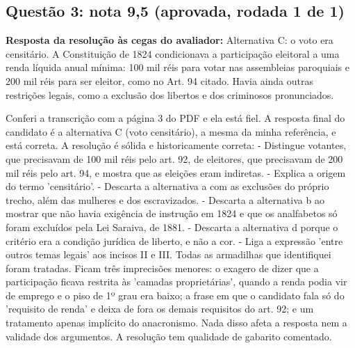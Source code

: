 \documentclass{article}%
\begin{document}
\subsection*{Questão 3: nota 9,5 (aprovada, rodada 1 de 1)}%
\textbf{Resposta da resolução às cegas do avaliador:} Alternativa C: o voto era censitário. A Constituição de 1824 condicionava a participação eleitoral a uma renda líquida anual mínima: 100 mil réis para votar nas assembleias paroquiais e 200 mil réis para ser eleitor, como no Art. 94 citado. Havia ainda outras restrições legais, como a exclusão dos libertos e dos criminosos pronunciados.\par %
Conferi a transcrição com a página 3 do PDF e ela está fiel. A resposta final do candidato é a alternativa C (voto censitário), a mesma da minha referência, e está correta. A resolução é sólida e historicamente correta:\newline%
{-} Distingue votantes, que precisavam de 100 mil réis pelo art. 92, de eleitores, que precisavam de 200 mil réis pelo art. 94, e mostra que as eleições eram indiretas.\newline%
{-} Explica a origem do termo 'censitário'.\newline%
{-} Descarta a alternativa a com as exclusões do próprio trecho, além das mulheres e dos escravizados.\newline%
{-} Descarta a alternativa b ao mostrar que não havia exigência de instrução em 1824 e que os analfabetos só foram excluídos pela Lei Saraiva, de 1881.\newline%
{-} Descarta a alternativa d porque o critério era a condição jurídica de liberto, e não a cor.\newline%
{-} Liga a expressão 'entre outros temas legais' aos incisos II e III.\newline%
Todas as armadilhas que identifiquei foram tratadas. Ficam três imprecisões menores: o exagero de dizer que a participação ficava restrita às 'camadas proprietárias', quando a renda podia vir de emprego e o piso de 1º grau era baixo; a frase em que o candidato fala só do 'requisito de renda' e deixa de fora os demais requisitos do art. 92; e um tratamento apenas implícito do anacronismo. Nada disso afeta a resposta nem a validade dos argumentos. A resolução tem qualidade de gabarito comentado.%
\end{document}
